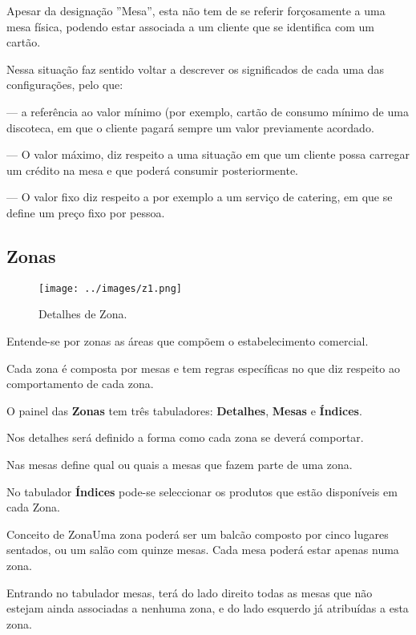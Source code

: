 \documentclass[a4paper,11pt,openany]{memoir}
\newcommand\exemplo{\texttt{[image: ../small-n-flat-master/png/96/notepad.png]}}
\newcommand{\bcexemplo}[2]{\vspace{5mm}\begin{bclogo}[couleur=green!30,logo=\exemplo]{\hspace{0.7cm}#1}{#2}\end{bclogo}}
\begin{document}
Apesar da designação ''Mesa'', esta não tem de se referir forçosamente a uma mesa física, podendo estar associada a um cliente que se identifica com um cartão.

Nessa situação faz sentido voltar a descrever os significados de cada uma das configurações, pelo que:

--- a referência ao valor mínimo (por exemplo, cartão de consumo mínimo de uma discoteca, em que o cliente pagará sempre um valor 
previamente acordado. 

--- O valor máximo, diz respeito a uma situação em que um cliente possa carregar um crédito na mesa e que poderá consumir posteriormente.

--- O valor fixo diz respeito a por exemplo a um serviço de catering, em que se define um preço fixo por pessoa.



\newpage

\subsection{Zonas}



\begin{figure}[h]
\begin{center}
\texttt{[image: ../images/z1.png]}
\caption[Submanifold]{Detalhes de Zona.}
\label{fig:detalheszona}
\end{center}
\end{figure}

Entende-se por zonas as áreas que compõem o estabelecimento comercial.

Cada zona é composta por mesas e tem regras específicas no que diz respeito ao comportamento de cada zona.

O painel das \textbf{Zonas} tem três tabuladores: \textbf{Detalhes}, \textbf{Mesas} e \textbf{Índices}.

Nos detalhes será definido a forma como cada zona se deverá comportar.

Nas mesas define qual ou quais a mesas que fazem parte de uma zona. 

No tabulador \textbf{Índices} pode-se seleccionar os produtos que estão disponíveis em cada Zona.

\bcexemplo{Conceito de Zona}{Uma zona poderá ser um balcão composto por cinco lugares sentados, ou um salão com quinze mesas. Cada mesa poderá estar apenas numa zona.} 

\newpage
Entrando no tabulador mesas, terá do lado direito todas as mesas que não estejam ainda associadas a nenhuma zona, e do lado esquerdo já atribuídas a esta zona. 
\end{document}

